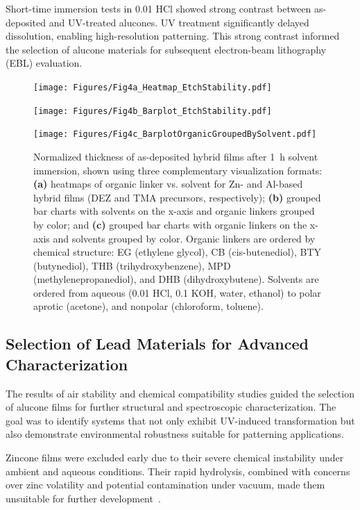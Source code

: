 Short-time immersion tests in \SI{0.01}{\molar} HCl showed strong contrast between as-deposited and UV-treated alucones. UV treatment significantly delayed dissolution, enabling high-resolution patterning. This strong contrast informed the selection of alucone materials for subsequent electron-beam lithography (EBL) evaluation.

\begin{figure}[H]
  \centering

  \texttt{[image: Figures/Fig4a\_Heatmap\_EtchStability.pdf]}
  \vspace{1em}

  \texttt{[image: Figures/Fig4b\_Barplot\_EtchStability.pdf]}
  \vspace{1em}

  \texttt{[image: Figures/Fig4c\_BarplotOrganicGroupedBySolvent.pdf]}

  \caption{
    Normalized thickness of as-deposited hybrid films after \SI{1}{\hour} solvent immersion, shown using three complementary visualization formats:
    \textbf{(a)} heatmaps of organic linker vs. solvent for Zn- and Al-based hybrid films (DEZ and TMA precursors, respectively);
    \textbf{(b)} grouped bar charts with solvents on the x-axis and organic linkers grouped by color; and
    \textbf{(c)} grouped bar charts with organic linkers on the x-axis and solvents grouped by color.
    Organic linkers are ordered by chemical structure: EG (ethylene glycol), CB (cis-butenediol), BTY (butynediol), THB (trihydroxybenzene), MPD (methylenepropanediol), and DHB (dihydroxybutene).
    Solvents are ordered from aqueous (\SI{0.01}{\molar} HCl, \SI{0.1}{\molar} KOH, water, ethanol) to polar aprotic (acetone), and nonpolar (chloroform, toluene).
  }
  \label{fig:developer_visualization_comparison}
\end{figure}

\subsection{Selection of Lead Materials for Advanced Characterization}

The results of air stability and chemical compatibility studies guided the selection of alucone films for further structural and spectroscopic characterization. The goal was to identify systems that not only exhibit UV-induced transformation but also demonstrate environmental robustness suitable for patterning applications.

Zincone films were excluded early due to their severe chemical instability under ambient and aqueous conditions. Their rapid hydrolysis, combined with concerns over zinc volatility and potential contamination under vacuum, made them unsuitable for further development~\cite{Richey2019}.

